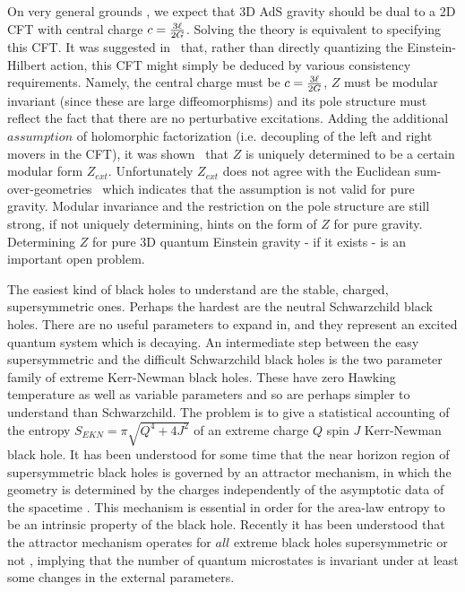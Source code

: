  On very general grounds \jbmh, we expect that 3D AdS gravity should be dual to a 2D CFT with central charge 
$c={3\ell \over 2 G}$. Solving the theory is equivalent to specifying this CFT. It was suggested in \witrec\ that, rather than 
directly quantizing the Einstein-Hilbert action,  this CFT might simply be deduced by various consistency requirements. Namely, the central charge must be $c={3\ell \over 2 G}$, $Z$ must be modular invariant (since these are large diffeomorphisms) and its pole structure must reflect the fact that there are no perturbative excitations. Adding the additional $assumption$ of holomorphic factorization (i.e. decoupling of the left and right movers in the CFT), it was shown \witrec\ that $Z$ is uniquely determined to be a certain modular form $Z_{ext}$. Unfortunately $Z_{ext}$ does not agree with the Euclidean sum-over-geometries \witmal\  which indicates that the assumption is not valid for pure gravity.  Modular invariance and the restriction on the pole structure are still strong, if not uniquely determining, hints on the form of $Z$ for pure gravity. Determining $Z$ for pure 3D quantum Einstein gravity - if it exists - is an important open problem. 

The easiest kind of black holes to understand are the stable, charged, supersymmetric ones.  Perhaps the hardest are the neutral Schwarzchild black holes. There are no useful parameters to expand in, and they represent an excited quantum system which is decaying.  An intermediate step between the easy supersymmetric and the difficult Schwarzchild black holes is the two parameter family of 
extreme Kerr-Newman black holes. These have zero Hawking temperature as well as variable parameters and so are perhaps simpler to understand than Schwarzchild. The problem is to give a statistical accounting of the entropy $S_{EKN}=\pi\sqrt{Q^4+4J^2}$ of an extreme charge $Q$ spin $J$ Kerr-Newman black hole. 
 It has been understood for some time that the near horizon region of supersymmetric black holes
is governed by an attractor mechanism, in which the geometry is determined by the charges independently of the asymptotic data of the spacetime \fks. This mechanism is essential in order for the area-law entropy to be an intrinsic property of the black hole. Recently it has been understood that the attractor mechanism operates for 
$all$ extreme black holes supersymmetric or not \sen, implying that the number of quantum microstates is invariant under at least some changes in the external parameters. 

